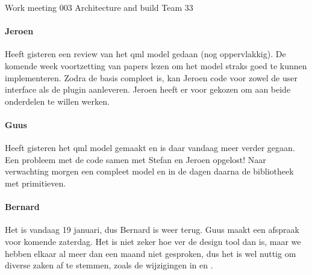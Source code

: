 \documentclass[a4paper,final]{article}
\begin{document}
\begin{Minutes}{Work meeting 003 Architecture and build Team 33}
\paragraph{Jeroen} Heeft gisteren een review van het qml model gedaan (nog
oppervlakkig). De komende week voortzetting van papers lezen om het model
straks goed te kunnen implementeren. Zodra de basis compleet is, kan Jeroen 
code voor zowel de user interface als de plugin aanleveren. Jeroen heeft 
er voor gekozen om aan beide onderdelen te willen werken. 

\paragraph{Guus} Heeft gisteren het qml model gemaakt en is daar vandaag meer 
verder gegaan. Een probleem met de code samen met Stefan en Jeroen opgelost!
Naar verwachting morgen een compleet model en in de dagen daarna de bibliotheek
met primitieven.

\paragraph{Bernard} Het is vandaag 19 januari, dus Bernard is weer terug. Guus
maakt een afspraak voor komende zaterdag. Het is niet zeker hoe ver de 
design tool dan is, maar we hebben elkaar al meer dan een maand niet gesproken,
dus het is wel nuttig om diverse zaken af te stemmen, zoals de wijzigingen in
\qt en \qml.

\end{Minutes}
\end{document}
